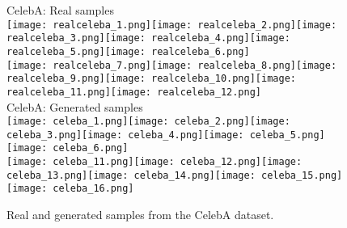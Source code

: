 \begin{figure}
	\centering
	CelebA: Real samples\\
	\texttt{[image: realceleba\_1.png]}\hspace{5px}\texttt{[image: realceleba\_2.png]}\hspace{5px}\texttt{[image: realceleba\_3.png]}\hspace{5px}\texttt{[image: realceleba\_4.png]}\hspace{5px}\texttt{[image: realceleba\_5.png]}\hspace{5px}\texttt{[image: realceleba\_6.png]}\\
	\vspace{0.1cm}
	\texttt{[image: realceleba\_7.png]}\hspace{5px}\texttt{[image: realceleba\_8.png]}\hspace{5px}\texttt{[image: realceleba\_9.png]}\hspace{5px}\texttt{[image: realceleba\_10.png]}\hspace{5px}\texttt{[image: realceleba\_11.png]}\hspace{5px}\texttt{[image: realceleba\_12.png]}\\
	
	CelebA: Generated samples\\
	\texttt{[image: celeba\_1.png]}\hspace{5px}\texttt{[image: celeba\_2.png]}\hspace{5px}\texttt{[image: celeba\_3.png]}\hspace{5px}\texttt{[image: celeba\_4.png]}\hspace{5px}\texttt{[image: celeba\_5.png]}\hspace{5px}\texttt{[image: celeba\_6.png]}\\
	\vspace{0.1cm}
	\texttt{[image: celeba\_11.png]}\hspace{5px}\texttt{[image: celeba\_12.png]}\hspace{5px}\texttt{[image: celeba\_13.png]}\hspace{5px}\texttt{[image: celeba\_14.png]}\hspace{5px}\texttt{[image: celeba\_15.png]}\hspace{5px}\texttt{[image: celeba\_16.png]}\\
	
	\caption{Real and generated samples from the CelebA dataset.}
	\label{fig:samples_celeba}
\end{figure}

